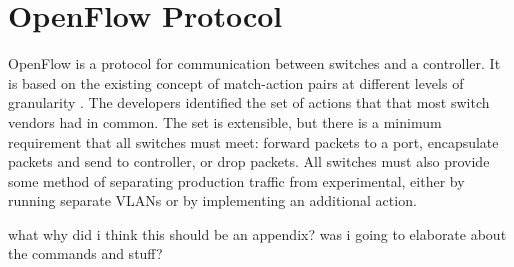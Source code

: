 \chapter{OpenFlow Protocol}
OpenFlow \cite{onf:switch140} is a protocol for communication between switches and a controller. It is based on the existing concept of match-action pairs at different levels of granularity \cite{mckeown:sdn}. The developers identified the set of actions that that most switch vendors had in common. The set is extensible, but there is a minimum requirement that all switches must meet: forward packets to a port, encapsulate packets and send to controller, or drop packets. All switches must also provide some method of separating production traffic from experimental, either by running separate VLANs or by implementing an additional action.

what why did i think this should be an appendix? was i going to elaborate about the commands and stuff?
